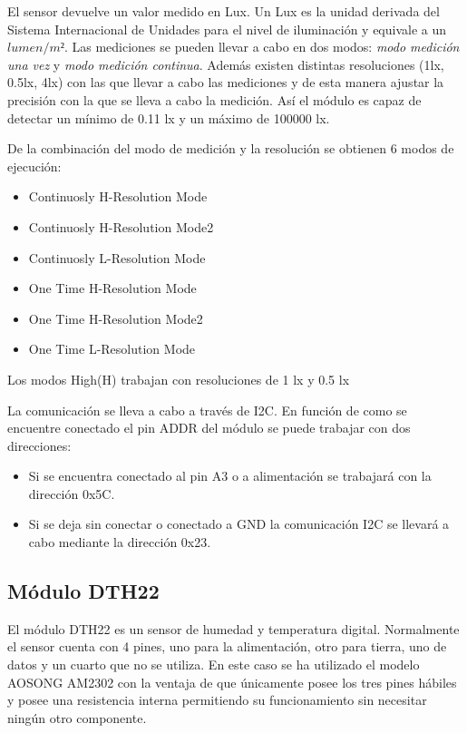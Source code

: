El sensor devuelve un valor medido en Lux. Un Lux es la unidad
derivada del Sistema Internacional de Unidades para el nivel de
iluminaci\'on y equivale a un $lumen/m²$. Las mediciones se pueden
llevar a cabo en dos modos: \emph{modo medici\'on una vez} y \emph{modo
  medici\'on continua}. Adem\'as existen distintas resoluciones (1lx,
0.5lx, 4lx) con
las que llevar a cabo las mediciones y de esta manera ajustar la
precisi\'on con la que se lleva a cabo la medici\'on. As\'i el m\'odulo es capaz de detectar un
m\'inimo de 0.11 lx y un m\'aximo de 100000 lx. 

De la combinaci\'on del modo de medici\'on y la resoluci\'on se
obtienen 6 modos de ejecuci\'on:
\begin{itemize}
\item Continuosly H-Resolution Mode
\item Continuosly H-Resolution Mode2
\item Continuosly L-Resolution Mode
\item One Time H-Resolution Mode
\item One Time H-Resolution Mode2
\item One Time L-Resolution Mode
\end{itemize}

Los modos High(H) trabajan con resoluciones de 1 lx y 0.5 lx 

La comunicaci\'on se lleva a cabo a trav\'es de I2C. En funci\'on de
como se encuentre conectado el pin ADDR del m\'odulo se puede trabajar
con dos direcciones:
\begin{itemize}
\item Si se encuentra conectado al pin A3 o a alimentaci\'on se
  trabajar\'a con la direcci\'on 0x5C.
\item Si se deja sin conectar o conectado a GND la comunicaci\'on I2C
  se llevar\'a a cabo mediante la direcci\'on 0x23.
\end{itemize}

\subsection{M\'odulo DTH22}\label{subsec:dht22}

El m\'odulo DTH22 es un sensor de humedad y temperatura
digital. Normalmente el sensor cuenta con 4 pines, uno para la
alimentaci\'on, otro para tierra, uno de datos y un cuarto que no se
utiliza. En este caso se ha utilizado el modelo AOSONG AM2302 con la
ventaja de que \'unicamente posee los tres pines h\'abiles y posee una
resistencia interna permitiendo su funcionamiento sin necesitar
ning\'un otro componente.

